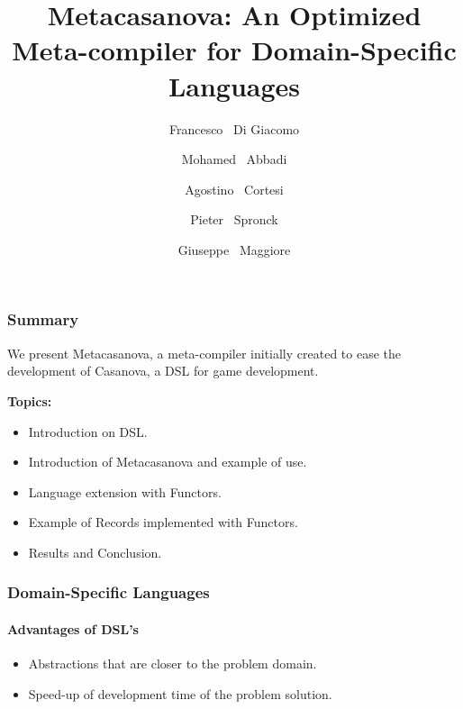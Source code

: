 \documentclass[10pt,a4paper]{beamer}
\begin{document}
\author[Di Giacomo et al.]
{Francesco ~Di Giacomo  \\
	\and Mohamed ~Abbadi  \\
	\and Agostino ~Cortesi  \\
	\and Pieter ~Spronck  \\
	\and Giuseppe ~Maggiore }
\date{}
\title{Metacasanova: An Optimized Meta-compiler for Domain-Specific Languages}

\frame{\titlepage}

\begin{frame}
\frametitle{Summary}

We present Metacasanova, a meta-compiler initially created to ease the development of Casanova, a DSL for game development.

\vspace{1cm}
\textbf{Topics:}
\begin{itemize}
	\item Introduction on DSL.
	\item Introduction of Metacasanova and example of use.
	\item Language extension with Functors.
	\item Example of Records implemented with Functors.
	\item Results and Conclusion.
\end{itemize}
\end{frame}


\begin{frame}
\frametitle{Domain-Specific Languages}
\framesubtitle{Advantages of DSL's}
\begin{itemize}
	\item Abstractions that are closer to the problem domain.
	\item Speed-up of development time of the problem solution.	
\end{itemize}
\end{frame}
\end{document}
